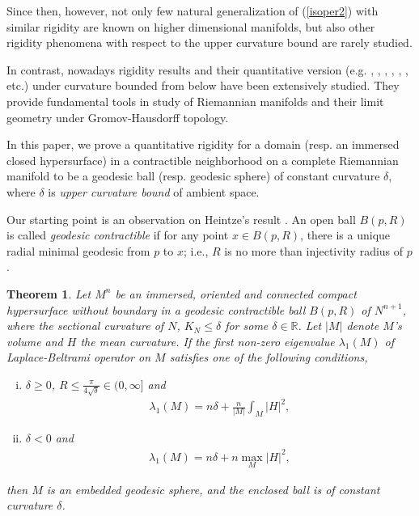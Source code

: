 \documentclass{amsart}
\numberwithin{equation}{section}
\newtheorem{theo}{Theorem}[section]
\theoremstyle{remark}
\renewcommand{\(}{\left(}
\renewcommand{\)}{\right)}
\renewcommand{\~}{\tilde}
\renewcommand{\-}{\overline}
\newcommand{\R}{\mathbb{R}}
\renewcommand{\d}{\delta}
\renewcommand{\l}{\lambda}
\begin{document}
Since then, however, not only few natural generalization of (\ref{isoper2}) with similar rigidity are known on higher dimensional manifolds, but also other rigidity phenomena with respect to the upper curvature bound are rarely studied.

In contrast, nowadays rigidity results and their quantitative version (e.g. \cite{Colding1996-1,Colding1996-2}, \cite{Cheeger-Colding1996},  \cite{Petersen1999}, \cite{Chen-Rong-Xu2016,Chen-Rong-Xu2018}, \cite{Miao-Wang2016}, \cite{Schroeder-Strake1989}, etc.) under curvature bounded from below have been extensively studied. They provide fundamental tools in study of Riemannian manifolds and their limit geometry under Gromov-Hausdorff topology.

In this paper, we prove a quantitative rigidity for a domain (resp. an immersed closed hypersurface) in a contractible neighborhood on a complete Riemannian manifold to be a geodesic ball (resp. geodesic sphere) of constant curvature $\d$, where $\d$ is \emph{upper curvature bound} of ambient space.

Our starting point is an observation on Heintze's result \cite{Heintze1988}. An open ball $B(p,R)$ is called \emph{geodesic contractible} if for any point $x\in B(p,R)$, there is a unique radial minimal geodesic from $p$ to $x$; i.e., $R$ is no more than injectivity radius of $p$.

\begin{theo}\label{main-theo-A} Let $M^n$ be an immersed, oriented and connected compact hypersurface without boundary in a geodesic contractible ball $B(p,R)$ of $N^{n+1}$, where the sectional curvature of $N$, $K_N \leq \d$ for some $\d\in \R$. Let $|M|$ denote $M$'s volume and $H$ the mean curvature. If the first non-zero eigenvalue $\lambda_1(M)$ of Laplace-Beltrami operator on $M$ satisfies one of the following conditions,
	\begin{enumerate}[(i)]
		\item $\d\geq 0$, $R\le\frac{\pi}{4\sqrt{\d}}\in (0,\infty]$ and
		\begin{align}\label{1steigeneq-1}
		\l_1(M)= n\d+\frac{n}{|M|}\int_{M}|H|^2,
		\end{align}
		\item $\d<0$ and
		\begin{align}\label{1steigeneq-2}
		\l_1(M)= n\d+n\max_{M}|H|^2,
		\end{align}
	\end{enumerate}
	then $M$ is an embedded geodesic sphere, and the enclosed ball is of constant curvature $\d$.
\end{theo}
\end{document}
